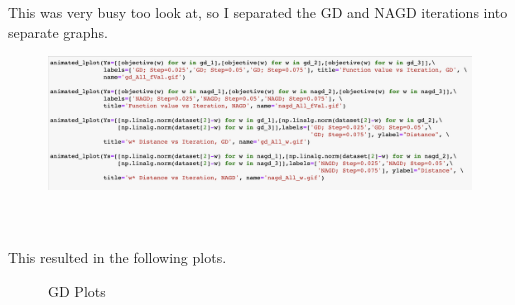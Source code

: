 \documentclass[12pt, letterpaper]{article}
\begin{document}
This was very busy too look at, so I separated the GD and NAGD iterations into separate graphs.\\
\begin{figure}[h!]
  \centering
  \includegraphics[scale=0.5]{./img/gd_nagd_separated_plots}
\end{figure}\\
\\
This resulted in the following plots.\\
\begin{figure}[h!]%
    \centering
    \qquad
    \caption{GD Plots}%
    \label{fig:example}%
\end{figure}\\
\end{document}
